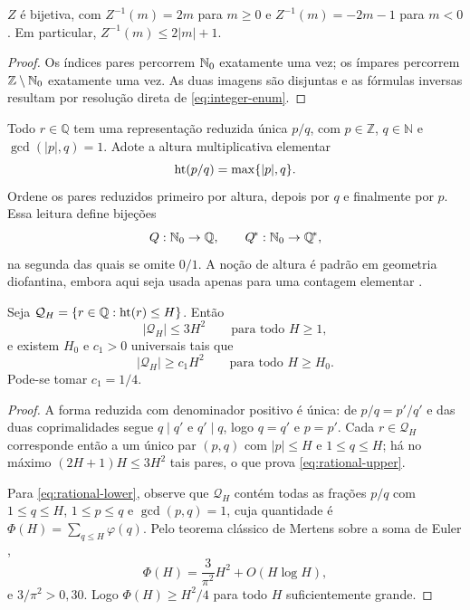 \begin{lemma}\label{lem:integers}
$Z$ é bijetiva, com $Z^{-1}(m)=2m$ para $m\ge0$ e $Z^{-1}(m)=-2m-1$ para $m<0$. Em particular, $Z^{-1}(m)\le2|m|+1$.
\end{lemma}

\begin{proof}
Os índices pares percorrem $\mathbb{N}_0$ exatamente uma vez; os ímpares percorrem $\mathbb{Z}\setminus\mathbb{N}_0$ exatamente uma vez. As duas imagens são disjuntas e as fórmulas inversas resultam por resolução direta de \eqref{eq:integer-enum}.
\end{proof}

Todo $r\in\mathbb{Q}$ tem uma representação reduzida única $p/q$, com $p\in\mathbb{Z}$, $q\in\mathbb{N}$ e $\gcd(|p|,q)=1$. Adote a altura multiplicativa elementar
\begin{equation}
 \operatorname{ht}(p/q)=\max\{|p|,q\}.
 \label{eq:height}
\end{equation}
Ordene os pares reduzidos primeiro por altura, depois por $q$ e finalmente por $p$. Essa leitura define bijeções
\begin{equation}
 Q:\mathbb{N}_0\to\mathbb{Q},\qquad Q^{\!*}:\mathbb{N}_0\to\mathbb{Q}^{\!*},
 \label{eq:q-enums}
\end{equation}
na segunda das quais se omite $0/1$. A noção de altura é padrão em geometria diofantina, embora aqui seja usada apenas para uma contagem elementar \citep{bombieri2006}.

\begin{lemma}\label{lem:rational-count}
Seja $\mathcal{Q}_H=\{r\in\mathbb{Q}:\operatorname{ht}(r)\le H\}$. Então
\begin{equation}
 |\mathcal{Q}_H|\le 3H^2
 \qquad\text{para todo }H\ge1,
 \label{eq:rational-upper}
\end{equation}
e existem $H_0$ e $c_1>0$ universais tais que
\begin{equation}
 |\mathcal{Q}_H|\ge c_1H^2
 \qquad\text{para todo }H\ge H_0.
 \label{eq:rational-lower}
\end{equation}
Pode-se tomar $c_1=1/4$.
\end{lemma}

\begin{proof}
A forma reduzida com denominador positivo é única: de $p/q=p'/q'$ e das duas coprimalidades segue $q\mid q'$ e $q'\mid q$, logo $q=q'$ e $p=p'$. Cada $r\in\mathcal{Q}_H$ corresponde então a um único par $(p,q)$ com $|p|\le H$ e $1\le q\le H$; há no máximo $(2H+1)H\le3H^2$ tais pares, o que prova \eqref{eq:rational-upper}.

Para \eqref{eq:rational-lower}, observe que $\mathcal{Q}_H$ contém todas as frações $p/q$ com $1\le q\le H$, $1\le p\le q$ e $\gcd(p,q)=1$, cuja quantidade é $\Phi(H)=\sum_{q\le H}\varphi(q)$. Pelo teorema clássico de Mertens sobre a soma de Euler \citep[Teorema 330]{hardywright2008},
\[
 \Phi(H)=\frac{3}{\pi^2}H^2+O(H\log H),
\]
e $3/\pi^2>0{,}30$. Logo $\Phi(H)\ge H^2/4$ para todo $H$ suficientemente grande.
\end{proof}

